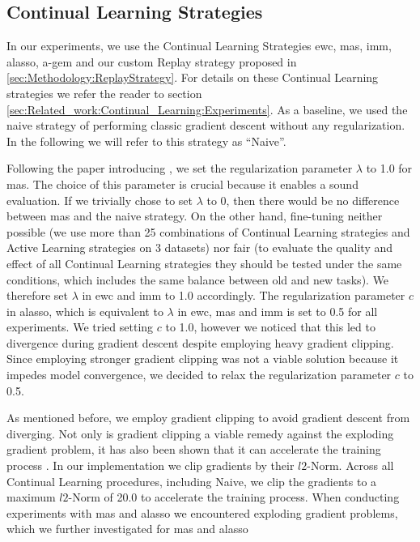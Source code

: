 \subsection{Continual Learning Strategies}
\label{sec:ExperimentSetup:CLStrategies}
In our experiments, we use the Continual Learning Strategies \gls{ewc}, \gls{mas}, \gls{imm}, \gls{alasso}, \gls{a-gem} and our custom Replay strategy
proposed in \ref{sec:Methodology:ReplayStrategy}. For details on these Continual Learning strategies we refer the reader to section 
\ref{sec:Related_work:Continual_Learning:Experiments}. As a baseline, we used the naive strategy of performing classic gradient descent without any
regularization. In the following we will refer to this strategy as \enquote{Naive}. \par
Following the paper introducing \cite{mas} \cite{aljundi2018memory}, we set the regularization parameter $\lambda$ to 1.0 for \gls{mas}. The choice of
this parameter is crucial because it enables a sound evaluation. If we trivially chose to set $\lambda$ to 0, then there would be no difference between
\gls{mas} and the naive strategy. On the other hand, fine-tuning neither possible (we use more than 25 combinations of Continual Learning strategies and
Active Learning strategies on 3 datasets) nor fair (to evaluate the quality and effect of all Continual Learning strategies they should be tested under
the same conditions, which includes the same balance between old and new tasks). We therefore set $\lambda$ in \gls{ewc} and \gls{imm} to 1.0 accordingly.
The regularization parameter $c$ in \gls{alasso}, which is equivalent to $\lambda$ in \gls{ewc}, \gls{mas} and \gls{imm} is set to 0.5 for all experiments.
We tried setting $c$ to 1.0, however we noticed that this led to divergence during gradient descent despite employing heavy gradient clipping. Since employing
stronger gradient clipping was not a viable solution because it impedes model convergence, we decided to relax the regularization parameter $c$ to 0.5. \par
As mentioned before, we employ gradient clipping to avoid gradient descent from diverging. Not only is gradient clipping a viable remedy against the exploding
gradient problem, it has also been shown that it can accelerate the training process \cite{zhang2019gradient}. In our implementation we clip gradients by their
$l2$-Norm. Across all Continual Learning procedures, including Naive, we clip the gradients to a maximum $l2$-Norm of 20.0 to accelerate the training process.
When conducting experiments with \gls{mas} and \gls{alasso} we encountered exploding gradient problems, which we further investigated for \gls{mas} and \gls{alasso}

